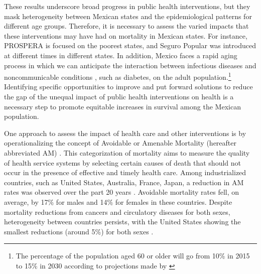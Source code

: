 \documentclass[11.5pt]{article}
\begin{document}
\begin{spacing}{1.5}
These results underscore broad progress in public health interventions, but they mask heterogeneity between Mexican states and the epidemiological patterns for different age groups. Therefore, it is necessary to assess the varied impacts that these interventions may have had on mortality in Mexican states. For instance, PROSPERA is focused on the poorest states, and Seguro Popular was introduced at different times in different states. In addition, Mexico faces a rapid aging process in which we can anticipate the interaction between infectious diseases and noncommunicable conditions \citep{Bygbjerg1499}, such as diabetes, on the adult population.\footnote{The percentage of the population aged 60 or older will go from 10\% in 2015 to 15\% in 2030 according to projections made by \citet{CONAPO}} Identifying specific opportunities to improve and put forward solutions to reduce the gap of  the unequal impact of public health interventions on health is a necessary step to promote equitable increases in survival among the Mexican population.%
 
 One approach to assess the impact of health care and other interventions is by operationalizing the
 concept of Avoidable or Amenable Mortality (hereafter abbreviated AM)
 \citep{nolte&mckee2004, nolte&mckee2008,elo2014}. This categorization of mortality aims to measure the quality of health service systems by selecting certain
 causes of death that should not occur in the presence of effective and
 timely health care. Among industrialized countries, such as United States,
 Australia, France, Japan, a reduction in AM rates was
 observed over the part 20 years
 \citep{nolte&mckee2008}. Avoidable mortality rates fell, on average, by 17\%
 for males and 14\% for females in these countries. Despite mortality reductions from cancers and circulatory diseases for
 both sexes, heterogeneity between countries persists, with the United
 States showing the smallest reductions (around 5\%) for both sexes  \citep{nolte&mckee2008}. 
 

\end{spacing}
\end{document}
